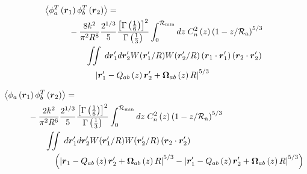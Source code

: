 \begin{equation}\label{tphase_n6}
\begin{aligned}
&\left\langle \phi^{T}_{a}\left(\boldsymbol{r}_{1}\right) \phi^{T}_{b}\left(\boldsymbol{r}_{2}\right)\right\rangle = \\
&\quad\quad\quad
-\frac{8k^{2}}{\pi^{2}R^{8}} 
\frac{2^{1/3}}{5}\frac{\left[\Gamma\left(\frac{1}{6}\right)\right]^{2}}{\Gamma\left(\frac{1}{3}\right)} 
\int_{0}^{\mathcal{R}_{\rm min}} dz\;C_{n}^{2}\left(z\right) 
\left(1 - z/\mathcal{R}_{\rm a}\right)^{5/3}\\
&\quad\quad\quad\quad\quad
\iint \; d\boldsymbol{r}^{\prime}_{1}d\boldsymbol{r}^{\prime}_{2} W(\boldsymbol{r}^{\prime}_{1}/R) W(\boldsymbol{r}^{\prime}_{2}/R)
\left(\boldsymbol{r}_{1} \cdot \boldsymbol{r}^{\prime}_{1}\right)
\left(\boldsymbol{r}_{2} \cdot \boldsymbol{r}^{\prime}_{2}\right)
\\
&\quad\quad\quad\quad\quad\quad
\left\vert \boldsymbol{r}^{\prime}_{1} - Q_{ab}\left(z\right) \boldsymbol{r}^{\prime}_{2} + \boldsymbol{\Omega}_{ab}\left(z\right) R\right\vert^{5/3}
\end{aligned}
\end{equation}

\begin{equation}\label{tprphase_n6}
\begin{aligned}
&\left\langle \phi_{a}\left(\boldsymbol{r}_{1}\right) \phi^{T}_{b}\left(\boldsymbol{r}_{2}\right)\right\rangle = \\
&\quad\quad\quad
-\frac{2k^{2}}{\pi^{2}R^{6}} 
\frac{2^{1/3}}{5}\frac{\left[\Gamma\left(\frac{1}{6}\right)\right]^{2}}{\Gamma\left(\frac{1}{3}\right)} 
\int_{0}^{\mathcal{R}_{\rm min}} dz\;C_{n}^{2}\left(z\right) 
\left(1 - z/\mathcal{R}_{\rm a}\right)^{5/3}\\
&\quad\quad\quad\quad\quad
\iint  \; d\boldsymbol{r}^{\prime}_{1}d\boldsymbol{r}^{\prime}_{2} W(\boldsymbol{r}^{\prime}_{1}/R) W(\boldsymbol{r}^{\prime}_{2}/R)
\left(\boldsymbol{r}_{2} \cdot \boldsymbol{r}^{\prime}_{2}\right)
\\
&\quad\quad\quad\quad\quad\quad
\left(
\left\vert \boldsymbol{r}_{1} - Q_{ab}\left(z\right)\boldsymbol{r}^{\prime}_{2} + \boldsymbol{\Omega}_{ab}\left(z\right) R\right\vert^{5/3}
- \left\vert \boldsymbol{r}^{\prime}_{1}  - 
 Q_{ab}\left(z\right)\boldsymbol{r}^{\prime}_{2} + \boldsymbol{\Omega}_{ab}\left(z\right) R \right\vert^{5/3}
\right)
\end{aligned}
\end{equation}

